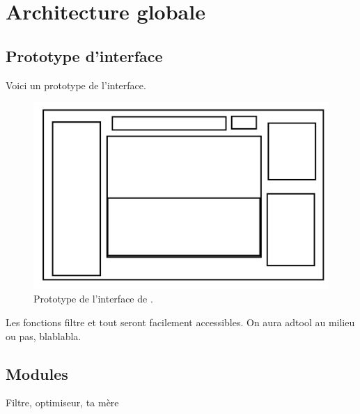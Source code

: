 \section{Architecture globale}
    \label{sec:archiGlobale}
    
    \subsection{Prototype d'interface}
    \label{sec:interface}
    
    Voici un prototype de l'interface.
    \begin{figure}[h!]
        \centering
        \includegraphics[height=0.4\textwidth]{figure/interface.png}
        \caption{Prototype de l'interface de \glasir{}.}
        \label{fig:glasir}
    \end{figure}
    
    Les fonctions filtre et tout seront facilement accessibles. On aura adtool au milieu ou pas, blablabla.
    
    \subsection{Modules}
    \label{sec:interface}
    
    Filtre, optimiseur, ta mère